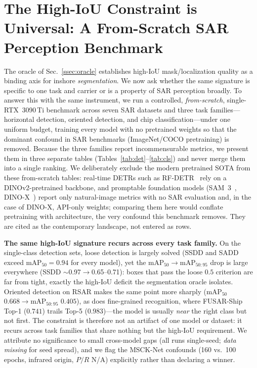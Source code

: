 \documentclass[journal]{IEEEtran}
\begin{document}
\section{The High-IoU Constraint is Universal: A From-Scratch SAR Perception Benchmark}
\label{sec:benchmark}
The oracle of Sec.~\ref{ssec:oracle} establishes high-IoU mask/localization quality as a binding axis for inshore \emph{segmentation}. We now ask whether the same signature is specific to one task and carrier or is a property of SAR perception broadly. To answer this with the same instrument, we run a controlled, \emph{from-scratch}, single-RTX~3090\,Ti benchmark across seven SAR datasets and three task families---horizontal detection, oriented detection, and chip classification---under one uniform budget, training every model with no pretrained weights so that the dominant confound in SAR benchmarks (ImageNet/COCO pretraining) is removed. Because the three families report incommensurable metrics, we present them in three separate tables (Tables~\ref{tab:det}--\ref{tab:cls}) and never merge them into a single ranking. We deliberately exclude the modern pretrained SOTA from these from-scratch tables: real-time DETRs such as RF-DETR~\cite{rfdetr} rely on a DINOv2-pretrained backbone, and promptable foundation models (SAM~3~\cite{sam3}, DINO-X~\cite{dinox}) report only natural-image metrics with no SAR evaluation and, in the case of DINO-X, API-only weights; comparing them here would conflate pretraining with architecture, the very confound this benchmark removes. They are cited as the contemporary landscape, not entered as rows.



\textbf{The same high-IoU signature recurs across every task family.} On the single-class detection sets, loose detection is largely solved (SSDD and SADD exceed mAP$_{50}=0.94$ for every model), yet the mAP$_{50}\!\to\!$mAP$_{50:95}$ drop is large everywhere (SSDD $\sim$0.97$\to$0.65--0.71): boxes that pass the loose $0.5$ criterion are far from tight, exactly the high-IoU deficit the segmentation oracle isolates. Oriented detection on RSAR makes the same point more sharply (mAP$_{50}$ $0.668\!\to\!$mAP$_{50:95}$ $0.405$), as does fine-grained recognition, where FUSAR-Ship Top-1 ($0.741$) trails Top-5 ($0.983$)---the model is usually \emph{near} the right class but not first. The constraint is therefore not an artifact of one model or dataset: it recurs across task families that share nothing but the high-IoU requirement. We attribute no significance to small cross-model gaps (all runs single-seed; \emph{data missing} for seed spread), and we flag the MSCK-Net confounds (160 vs.\ 100 epochs, infrared origin, $P/R$ N/A) explicitly rather than declaring a winner.
\end{document}
